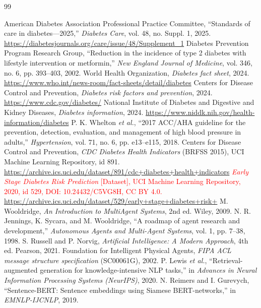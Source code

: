\documentclass[12pt,a4paper]{report}
\newcommand{\capnhat}[1]{\textcolor{red}{#1}}
\begin{document}
\begin{thebibliography}{99}
 American Diabetes Association Professional Practice Committee, ``Standards of care in diabetes---2025,'' \emph{Diabetes Care}, vol. 48, no. Suppl. 1, 2025. \url{https://diabetesjournals.org/care/issue/48/Supplement_1}
 Diabetes Prevention Program Research Group, ``Reduction in the incidence of type 2 diabetes with lifestyle intervention or metformin,'' \emph{New England Journal of Medicine}, vol. 346, no. 6, pp. 393--403, 2002.
 World Health Organization, \emph{Diabetes fact sheet}, 2024. \url{https://www.who.int/news-room/fact-sheets/detail/diabetes}
 Centers for Disease Control and Prevention, \emph{Diabetes risk factors and prevention}, 2024. \url{https://www.cdc.gov/diabetes/}
 National Institute of Diabetes and Digestive and Kidney Diseases, \emph{Diabetes information}, 2024. \url{https://www.niddk.nih.gov/health-information/diabetes}
 P. K. Whelton \emph{et al.}, ``2017 ACC/AHA guideline for the prevention, detection, evaluation, and management of high blood pressure in adults,'' \emph{Hypertension}, vol. 71, no. 6, pp. e13--e115, 2018.
 Centers for Disease Control and Prevention, \emph{CDC Diabetes Health Indicators} (BRFSS 2015), UCI Machine Learning Repository, id 891. \url{https://archive.ics.uci.edu/dataset/891/cdc+diabetes+health+indicators}
 \capnhat{\emph{Early Stage Diabetes Risk Prediction} [Dataset], UCI Machine Learning Repository, 2020, id 529, DOI: 10.24432/C5VG8H, CC BY 4.0. \url{https://archive.ics.uci.edu/dataset/529/early+stage+diabetes+risk+}}
 M. Wooldridge, \emph{An Introduction to MultiAgent Systems}, 2nd ed. Wiley, 2009.
 N. R. Jennings, K. Sycara, and M. Wooldridge, ``A roadmap of agent research and development,'' \emph{Autonomous Agents and Multi-Agent Systems}, vol. 1, pp. 7--38, 1998.
 S. Russell and P. Norvig, \emph{Artificial Intelligence: A Modern Approach}, 4th ed. Pearson, 2021.
 Foundation for Intelligent Physical Agents, \emph{FIPA ACL message structure specification} (SC00061G), 2002.
 P. Lewis \emph{et al.}, ``Retrieval-augmented generation for knowledge-intensive NLP tasks,'' in \emph{Advances in Neural Information Processing Systems (NeurIPS)}, 2020.
 N. Reimers and I. Gurevych, ``Sentence-BERT: Sentence embeddings using Siamese BERT-networks,'' in \emph{EMNLP-IJCNLP}, 2019.

\end{thebibliography}
\end{document}
